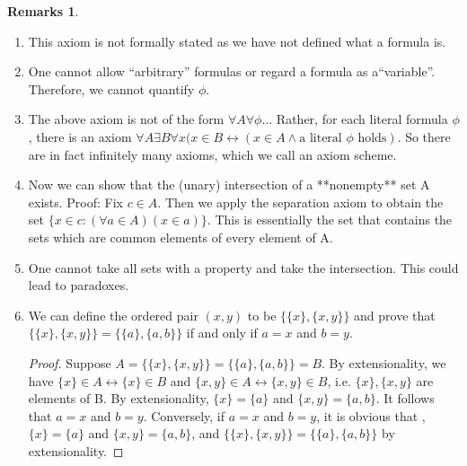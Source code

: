 \documentclass[14pt]{article}
\theoremstyle{definition}
\newtheorem*{remark}{Remarks}
\begin{document}
\begin{remark}
\hfill
\begin{enumerate}
    \item This axiom is not formally stated as we have not defined what a formula is.
    \item One cannot allow “arbitrary” formulas or regard a  formula as a“variable”. Therefore, we cannot quantify $\phi$.
    \item The above axiom is not of the form $\forall A\forall \phi ...$ Rather, for each literal formula $\phi$, there is an axiom $\forall A\exists B \forall x(x\in B \leftrightarrow (x\in A \land \text{a literal }\phi\text{ holds})$. So there are in fact infinitely many axioms, which we call an axiom scheme.
    \item Now we can show that the (unary) intersection of a **nonempty** set A exists. Proof: Fix $c\in A$. Then we apply the separation axiom to obtain the set $\{x\in c: (\forall a\in A)(x\in a) \}$. This is essentially the set that contains the sets which are common elements of every element of A.
    \item One cannot take all sets with a property and take the intersection. This could lead to paradoxes. 
    \item We can define the ordered pair $(x,y)$ to be $\big\{\{x\}, \{x,y\}\big\}$ and prove that $\big\{\{x\}, \{x,y\}\big\}=\big\{\{a\}, \{a,b\}\big\}$ if and only if $a=x$ and $b=y$.\begin{proof}
         Suppose $A=\big\{\{x\}, \{x,y\}\big\}=\big\{\{a\}, \{a,b\}\big\}=B$. By extensionality, we have $\{x\}\in A \leftrightarrow \{x\}\in B$ and $\{x,y\}\in A \leftrightarrow \{x,y\}\in B$, i.e. $\{x\}, \{x,y\}$ are elements of B. By extensionality, $\{x\}=\{a\}$ and $\{x,y\}=\{a,b\}$. It follows that $a=x$ and $b=y$.  Conversely, if $a=x$ and $b=y$, it is obvious that , $\{x\}=\{a\}$ and $\{x,y\}=\{a,b\}$, and  $\big\{\{x\}, \{x,y\}\big\}=\big\{\{a\}, \{a,b\}\big\}$ by extensionality.
    \end{proof}
   
\end{enumerate}
\end{remark}
\vspace{3mm}
\end{document}
